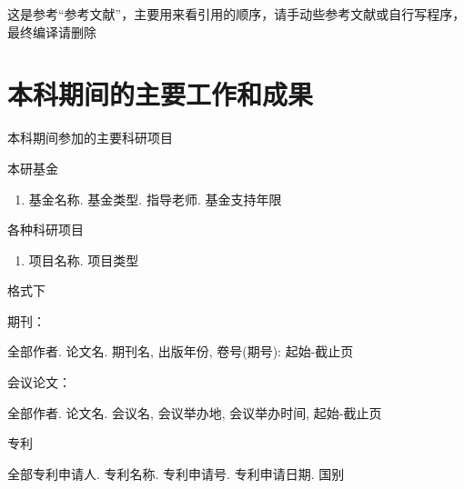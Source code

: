 \documentclass[utf8, a4paper, 10.5pt]{book}
\newcommand\clearemptydoublepage{\clearpage{\thispagestyle{empty}\cleardoublepage}}
\newcommand{\songti}{\CJKfamily{songti}}
\begin{document}
{
	\fancyhf{}
	\fancyfoot[RO,LE]{~\thepage~}
	\renewcommand{\headrulewidth}{0.7pt}
	\renewcommand{\footrulewidth}{0pt}
}
\fancyhf{}
\fancyfoot[RO,LE]{~\thepage~}
\renewcommand{\headrulewidth}{0.7pt}
\renewcommand{\footrulewidth}{0pt}








这是参考“参考文献”，主要用来看引用的顺序，请手动些参考文献或自行写程序，最终编译请删除
\clearemptydoublepage




\chapter*{本科期间的主要工作和成果}
\songti\fontsize{12pt}{12pt} %

本科期间参加的主要科研项目

\noindent 本研基金
\begin{enumerate}
	\item 基金名称. 基金类型. 指导老师. 基金支持年限
\end{enumerate}

\noindent 各种科研项目
\begin{enumerate}
	\item 项目名称. 项目类型
\end{enumerate}

格式下

期刊：

全部作者. 论文名. 期刊名, 出版年份, 卷号(期号): 起始-截止页

会议论文：

全部作者. 论文名. 会议名, 会议举办地, 会议举办时间, 起始-截止页

专利

全部专利申请人. 专利名称. 专利申请号. 专利申请日期. 国别



{
	\fancyhf{}
	\fancyfoot[RO,LE]{~\thepage~}
	\renewcommand{\headrulewidth}{0.7pt}
	\renewcommand{\footrulewidth}{0pt}
}
\fancyhf{}
\fancyfoot[RO,LE]{~\thepage~}
\renewcommand{\headrulewidth}{0.7pt}
\renewcommand{\footrulewidth}{0pt}
\clearemptydoublepage
\end{document}
